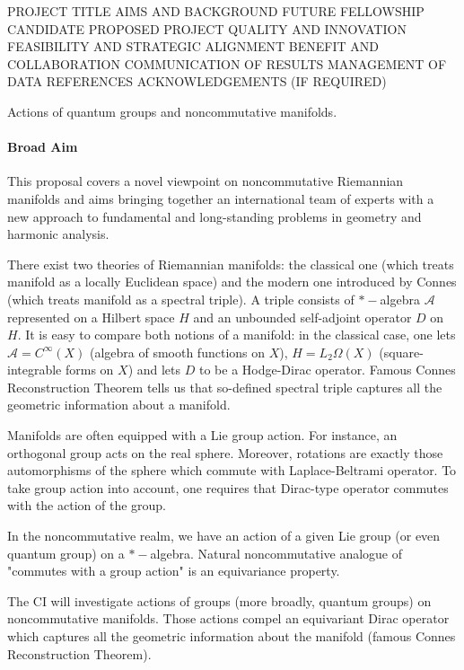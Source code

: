 \documentclass{article}
\newcommand{\archeading}[1]{\vspace{.3cm} \noindent{\bfseries #1} \vspace{.1cm}   }
\begin{document}
\parindent=20pt
\pagestyle{empty}
\newpage


PROJECT TITLE
AIMS AND BACKGROUND
FUTURE FELLOWSHIP CANDIDATE
PROPOSED PROJECT QUALITY AND INNOVATION
FEASIBILITY AND STRATEGIC ALIGNMENT
BENEFIT AND COLLABORATION
COMMUNICATION OF RESULTS
MANAGEMENT OF DATA
REFERENCES
ACKNOWLEDGEMENTS (IF REQUIRED)


\archeading{Project Title} Actions of quantum groups and noncommutative manifolds.

\bigskip\archeading{Aims and Background}

\paragraph*{Broad Aim} This proposal covers a novel viewpoint on noncommutative Riemannian manifolds and aims bringing together an international team of experts with a new approach to fundamental and long-standing problems in geometry and harmonic analysis.

There exist two theories of Riemannian manifolds: the classical one (which treats manifold as a locally Euclidean space) and the modern one introduced by Connes (which treats manifold as a spectral triple). A triple consists of $\ast-$algebra $\mathcal{A}$ represented on a Hilbert space $H$ and an unbounded self-adjoint operator $D$ on $H.$ It is easy to compare both notions of a manifold: in the classical case, one lets $\mathcal{A}=C^{\infty}(X)$ (algebra of smooth functions on $X$), $H=L_2\Omega(X)$ (square-integrable forms on $X$) and lets $D$ to be a Hodge-Dirac operator. Famous Connes Reconstruction Theorem tells us that so-defined spectral triple captures all the geometric information about a manifold.

Manifolds are often equipped with a Lie group action. For instance, an orthogonal group acts on the real sphere. Moreover, rotations are exactly those automorphisms of the sphere which commute with Laplace-Beltrami operator. To take group action into account, one requires that Dirac-type operator commutes with the action of the group.

In the noncommutative realm, we have an action of a given Lie group (or even quantum group) on a $\ast-$algebra. Natural noncommutative analogue of "commutes with a group action" is an equivariance property.



The CI will investigate actions of groups (more broadly, quantum groups) on noncommutative manifolds. Those actions compel an equivariant Dirac operator which captures all the geometric information about the manifold (famous Connes Reconstruction Theorem). 
\end{document}
